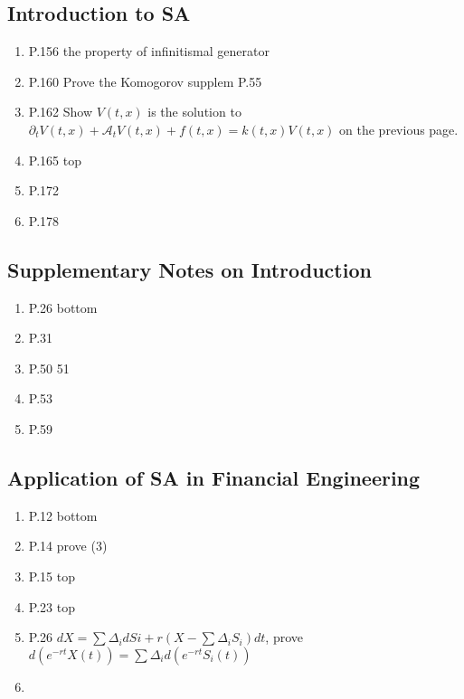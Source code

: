 \documentclass[a4paper, 11pt]{article}
\begin{document}
\subsection{Introduction to SA}
\begin{enumerate}

	\item P.156 the property of infinitismal generator
	\item P.160 Prove the Komogorov  supplem P.55
	\item P.162 Show $V(t, x)$ is the solution to $\partial_t V(t, x) + \mathcal{A}_t V(t, x) + f(t, x) = k(t, x)V(t,x)$ on the previous page.
	\item P.165 top
	\item P.172
	\item P.178
\end{enumerate}

\subsection{Supplementary Notes on Introduction}
\begin{enumerate}
	\item P.26 bottom
	\item P.31
	\item P.50 51
	\item P.53
	\item P.59
\end{enumerate}

\subsection{Application of SA in Financial Engineering}
\begin{enumerate}
	\item P.12 bottom
	\item P.14 prove (3)
	\item P.15 top
	\item P.23 top
	\item P.26 $dX = \sum \Delta_i dSi + r(X - \sum \Delta_i S_i)dt$, prove $d(e^{-rt} X(t)) = \sum \Delta_i d(e^{-rt} S_i(t))$
	\item 
\end{enumerate}
\end{document}

